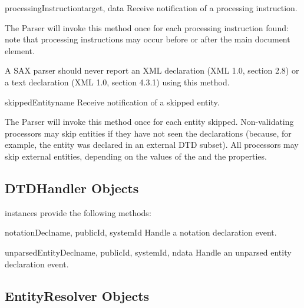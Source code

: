 \begin{methoddesc}[ContentHandler]{processingInstruction}{target, data}
  Receive notification of a processing instruction.
        
  The Parser will invoke this method once for each processing
  instruction found: note that processing instructions may occur
  before or after the main document element.

  A SAX parser should never report an XML declaration (XML 1.0,
  section 2.8) or a text declaration (XML 1.0, section 4.3.1) using
  this method.
\end{methoddesc}

\begin{methoddesc}[ContentHandler]{skippedEntity}{name}
  Receive notification of a skipped entity.
        
  The Parser will invoke this method once for each entity
  skipped. Non-validating processors may skip entities if they have
  not seen the declarations (because, for example, the entity was
  declared in an external DTD subset). All processors may skip
  external entities, depending on the values of the
   and the
  properties.
\end{methoddesc}


\subsection{DTDHandler Objects \label{dtd-handler-objects}}

 instances provide the following methods:

\begin{methoddesc}[DTDHandler]{notationDecl}{name, publicId, systemId}
  Handle a notation declaration event.
\end{methoddesc}

\begin{methoddesc}[DTDHandler]{unparsedEntityDecl}{name, publicId,
                                                   systemId, ndata}
  Handle an unparsed entity declaration event.
\end{methoddesc}


\subsection{EntityResolver Objects \label{entity-resolver-objects}}

